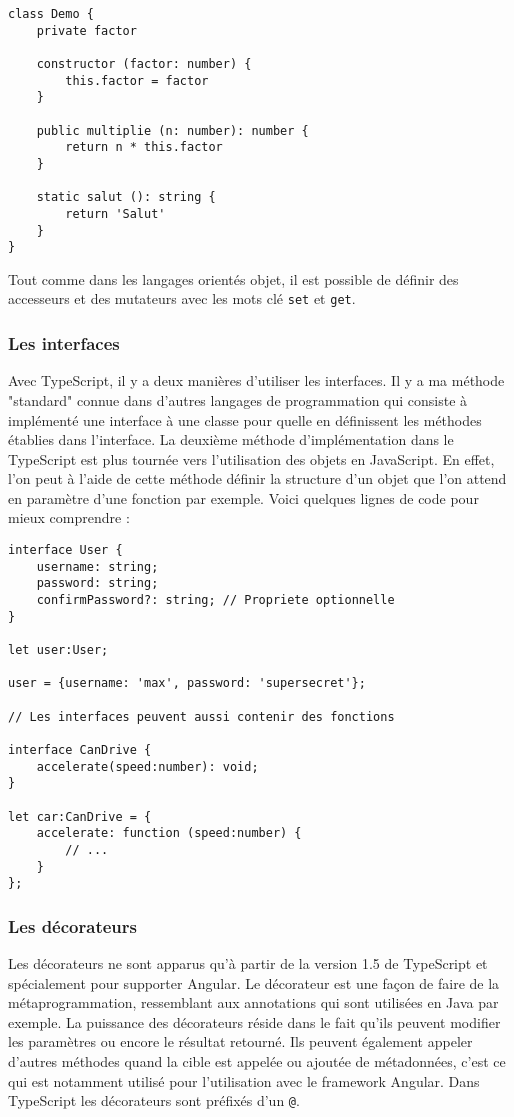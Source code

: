 \begin{lstlisting}[style=htmlcssjs, caption={Les classes en TypeScript}]
class Demo {
    private factor

    constructor (factor: number) {
        this.factor = factor
    }

    public multiplie (n: number): number {
        return n * this.factor
    }

    static salut (): string {
        return 'Salut'
    }
}
\end{lstlisting}
Tout comme dans les langages orientés objet, il est possible de définir des accesseurs et des mutateurs avec les mots clé \texttt{set} et \texttt{get}.

\subsubsection{Les interfaces}
Avec TypeScript, il y a deux manières d'utiliser les interfaces. Il y a ma méthode "standard" connue dans d'autres langages de programmation qui consiste à implémenté une interface à une classe pour quelle en définissent les méthodes établies dans l'interface. La deuxième méthode d'implémentation dans le TypeScript est plus tournée vers l'utilisation des objets en JavaScript. En effet, l'on peut à l'aide de cette méthode définir la structure d'un objet que l'on attend en paramètre d'une fonction par exemple. Voici quelques lignes de code pour mieux comprendre :
\begin{lstlisting}[style=htmlcssjs, caption={Les interfaces en TypeScript}]
interface User {
    username: string;
    password: string;
    confirmPassword?: string; // Propriete optionnelle
}

let user:User;

user = {username: 'max', password: 'supersecret'};

// Les interfaces peuvent aussi contenir des fonctions

interface CanDrive {
    accelerate(speed:number): void;
}

let car:CanDrive = {
    accelerate: function (speed:number) {
        // ...
    }
};
\end{lstlisting}

\subsubsection{Les décorateurs}
Les décorateurs ne sont apparus qu'à partir de la version 1.5 de TypeScript et spécialement pour supporter Angular\cite{ninja:angular}. Le décorateur est une façon de faire de la métaprogrammation, ressemblant aux annotations qui sont utilisées en Java par exemple. La puissance des décorateurs réside dans le fait qu'ils peuvent modifier les paramètres ou encore le résultat retourné. Ils peuvent également appeler d'autres méthodes quand la cible est appelée ou ajoutée de métadonnées, c'est ce qui est notamment utilisé pour l'utilisation avec le framework Angular. Dans TypeScript les décorateurs sont préfixés d'un \texttt{@}.

